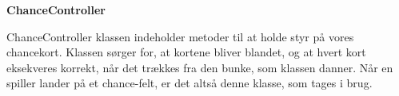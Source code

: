 \textbf{ChanceController}

ChanceController klassen indeholder metoder til at holde styr på vores chancekort. Klassen sørger for, at kortene bliver blandet, og at hvert kort eksekveres korrekt, når det trækkes fra den bunke, som klassen danner. Når en spiller lander på et chance-felt, er det altså denne klasse, som tages i brug.